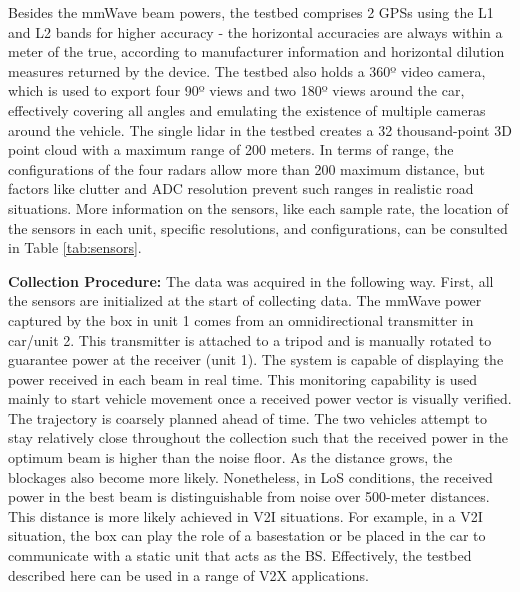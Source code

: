 \documentclass[10pt,comsoc]{IEEEtran}
\begin{document}
Besides the mmWave beam powers, the testbed comprises 2 GPSs using the L1 and L2 bands for higher accuracy - the horizontal accuracies are always within a meter of the true, according to manufacturer information and horizontal dilution measures returned by the device. The testbed also holds a 360º video camera, which is used to export four 90º views and two 180º views around the car, effectively covering all angles and emulating the existence of multiple cameras around the vehicle. The single lidar in the testbed creates a 32 thousand-point 3D point cloud with a maximum range of 200 meters. In terms of range, the configurations of the four radars allow more than 200 maximum distance, but factors like clutter and ADC resolution prevent such ranges in realistic road situations. More information on the sensors, like each sample rate, the location of the sensors in each unit, specific resolutions, and configurations, can be consulted in Table \ref{tab:sensors}. 

\textbf{Collection Procedure:} The data was acquired in the following way. First, all the sensors are initialized at the start of collecting data. The mmWave power captured by the box in unit 1 comes from an omnidirectional transmitter in car/unit 2. This transmitter is attached to a tripod and is manually rotated to guarantee power at the receiver (unit 1). The system is capable of displaying the power received in each beam in real time. This monitoring capability is used mainly to start vehicle movement once a received power vector is visually verified. The trajectory is coarsely planned ahead of time. The two vehicles attempt to stay relatively close throughout the collection such that the received power in the optimum beam is higher than the noise floor. As the distance grows, the blockages also become more likely. Nonetheless, in LoS conditions, the received power in the best beam is distinguishable from noise over 500-meter distances. This distance is more likely achieved in V2I situations. For example, in a V2I situation, the box can play the role of a basestation or be placed in the car to communicate with a static unit that acts as the BS. Effectively, the testbed described here can be used in a range of V2X applications. 
\end{document}
